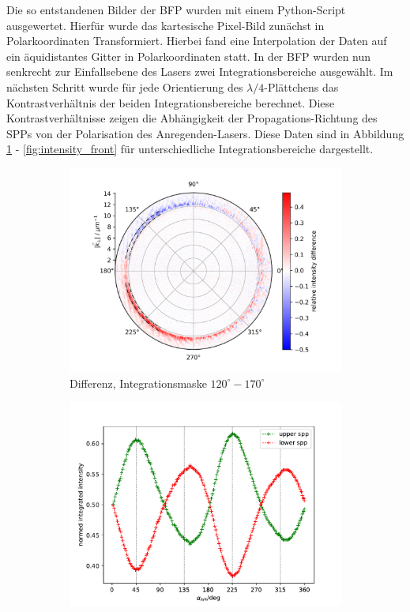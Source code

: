 \documentclass[titlepage]{article}
\begin{document}
	Die so entstandenen Bilder der BFP wurden mit einem Python-Script ausgewertet. Hierfür wurde das kartesische Pixel-Bild zunächst in Polarkoordinaten Transformiert. Hierbei fand eine Interpolation der Daten auf ein äquidistantes Gitter in Polarkoordinaten statt. In der BFP wurden nun senkrecht zur Einfallsebene des Lasers zwei Integrationsbereiche ausgewählt. Im nächsten Schritt wurde für jede Orientierung des $\lambda/4$-Plättchens das Kontrastverhältnis der beiden Integrationsbereiche berechnet. Diese Kontrastverhältnisse zeigen die Abhängigkeit der Propagations-Richtung des SPPs von der Polarisation des Anregenden-Lasers. Diese Daten sind in Abbildung \ref{fig:diff_back} - \ref{fig:intensity_front} für unterschiedliche Integrationsbereiche dargestellt.
	\begin{figure}
		\label{fig:spin_hall_measure}
		\centering
		\begin{subfigure}[b]{0.5\textwidth}
			\centering
			\includegraphics[width=\textwidth]{figures/spin_hall/diff_back.png}
			\caption{Differenz, Integrationsmaske $120^\circ-170^\circ$}
			\label{fig:diff_back}
		\end{subfigure}
		\hfill
		\begin{subfigure}[b]{0.49\textwidth}
			\centering
			\includegraphics[width=\textwidth]{figures/spin_hall/intensity_back.pdf}

\end{subfigure}
\end{figure}
\end{document}
